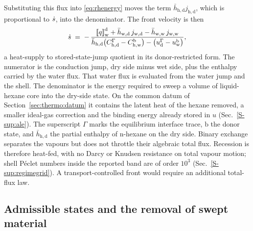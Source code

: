 Substituting this flux into \eqref{eq:rhenergy} moves the term
\(\bar{h}_{\mathrm{h,d}} j_{\mathrm{h,d}}\), which is proportional to
\(\dot{s}\), into the denominator. The front velocity is then
\begin{equation}
\dot{s} \;=\;
 -\,\frac{
   \left[\!\left[ q \right]\!\right]_{\mathrm{w}}^{\mathrm{d}}
   + \bar{h}_{\mathrm{w,d}}\, j_{\mathrm{w,d}}
   - \bar{h}_{\mathrm{w,w}}\, j_{\mathrm{w,w}}
 }{
   \bar{h}_{\mathrm{h,d}}\bigl(C_{\mathrm{h,d}}^{\Gamma}
    - C_{\mathrm{h,w}}^{\mathrm{b}}\bigr)
   - \bigl(u_{\mathrm{d}}^{\Gamma} - u_{\mathrm{w}}^{\mathrm{b}}\bigr)
 } ,
\label{eq:frontvelocity}
\end{equation}
a heat-supply to stored-state-jump quotient in its donor-restricted form.
The numerator is the conduction jump, dry side minus wet side, plus the
enthalpy carried by the water flux. That water flux is evaluated from the
water jump and the shell. The denominator is the energy required to sweep a
volume of liquid-hexane core into the dry-side state. On the common datum of
Section~\ref{sec:thermo:datum} it contains the latent heat of the hexane
removed, a smaller ideal-gas correction and the binding energy already stored
in \(u\) (Sec.~\ref*{S-sup:ale}). The superscript \(\Gamma\) marks the
equilibrium interface trace, \(\mathrm{b}\) the donor state, and
\(\bar{h}_{\mathrm{h,d}}\) the partial enthalpy of n-hexane on the dry side.
Binary exchange separates the vapours but does not throttle their algebraic
total flux. Recession is therefore heat-fed, with no Darcy or Knudsen
resistance on total vapour motion; shell P\'eclet numbers inside the
reported band are of order $10^3$ (Sec.~\ref*{S-sup:regimegrid}).
A transport-controlled front would require an additional total-flux law.

\subsection{Admissible states and the removal of swept material}
\label{sec:model:interface}
\label{sec:model:regimeA}
\label{sec:model:donor}

